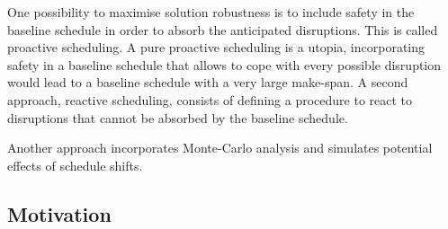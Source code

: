 One possibility to maximise solution robustness is to include safety in the baseline schedule in order to absorb the anticipated disruptions. This is called proactive scheduling. A pure proactive scheduling is a utopia, incorporating safety in a baseline schedule that allows to cope with every possible disruption would lead to a baseline schedule with a very large make-span. A second approach, reactive scheduling, consists of defining a procedure to react to disruptions that cannot be absorbed by the baseline schedule.

Another approach incorporates Monte-Carlo analysis and simulates potential effects of schedule shifts.


\subsection{Motivation}





